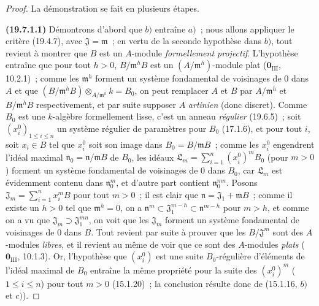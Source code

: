 \begin{proof}
La démonstration se fait en plusieurs étapes.

\medskip
\noindent{}\label{0.19.7.1.1-fr}\textbf{(19.7.1.1)}\enspace
Démontrons d'abord que $b)$ entraîne $a)$~; nous allons appliquer le critère
(19.4.7), avec $\mathfrak J=\mathfrak m$~; en vertu de la seconde hypothèse
dans $b)$, tout revient à montrer que $B$ est un $A$-module
\emph{formellement projectif}. L'hypothèse entraîne que pour tout $h>0$,
$B/\mathfrak m^hB$ est un $(A/\mathfrak m^h)$-module plat
($\mathbf 0_{\mathrm{III}}$, 10.2.1)~; comme les $\mathfrak m^h$ forment un
système fondamental de voisinages de 0 dans $A$ et que
$(B/\mathfrak m^hB)\otimes_{A/\mathfrak m^h}k=B_0$, on peut remplacer $A$ et
$B$ par $A/\mathfrak m^h$ et $B/\mathfrak m^hB$ respectivement, et par suite
supposer $A$ \emph{artinien} (donc discret). Comme $B_0$ est une $k$-algèbre
formellement lisse, c'est un anneau \emph{régulier} (19.6.5)~; soit
$(x_i^0)_{1\leq i\leq n}$ un système régulier de paramètres pour $B_0$
(17.1.6), et pour tout $i$, soit $x_i\in B$ tel que $x_i^0$ soit son image
dans $B_0=B/\mathfrak mB$~; comme les $x_i^0$ engendrent l'idéal maximal
$\mathfrak n_0=\mathfrak n/\mathfrak mB$ de $B_0$, les idéaux
$\mathfrak L_m=\sum_{i=1}^n(x_i^0)^mB_0$ (pour $m>0$)
forment un système fondamental de voisinages de 0 dans $B_0$, car
$\mathfrak L_m$ est évidemment contenu dans $\mathfrak n_0^m$, et d'autre
part contient $\mathfrak n_0^{mn}$. Posons
$\mathfrak J_m=\sum_{i=1}^n x_i^mB$ pour tout $m>0$~; il est clair que
$\mathfrak n=\mathfrak J_1+\mathfrak mB$~; comme il existe un $h>0$ tel que
$\mathfrak m^h=0$, on a
$\mathfrak n^m\subset\mathfrak J_1^{m-h}\subset\mathfrak n^{m-h}$ pour
$m>h$, et comme on a vu que $\mathfrak J_m\supset\mathfrak J_1^{mn}$, on voit
que les $\mathfrak J_m$ forment un système fondamental de voisinages de 0 dans
$B$. Tout revient par suite à prouver que les $B/\mathfrak J^m$ sont des
$A$-modules \emph{libres}, et il revient au même de voir que ce sont des
$A$-modules \emph{plats} ($\mathbf 0_{\mathrm{III}}$, 10.1.3). Or,
l'hypothèse que $(x_i^0)$ est une suite $B_0$-régulière d'éléments de l'idéal
maximal de $B_0$ entraîne la même propriété pour la suite des $(x_i^0)^m$
($1\leq i\leq n$) pour tout $m>0$ (15.1.20)~; la conclusion résulte donc de
(15.1.16, $b)$ et $c)$).
\end{proof}

